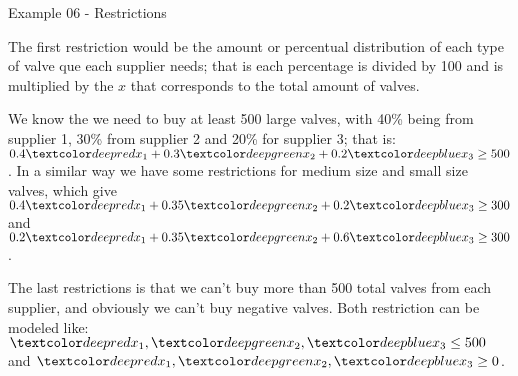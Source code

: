 \begin{frame}{Example 06 - Restrictions}

The first restriction would be the amount or percentual distribution of each
type of valve que each supplier needs; that is each percentage is divided by
100 and is multiplied by the $x$ that corresponds to the total amount of valves.

We know the we need to buy at least 500 large valves, with 40\% being from
supplier 1, 30\% from supplier 2 and 20\% for supplier 3; that is:
$0.4\colora{x_1} + 0.3 \colorb{x_2} + 0.2\colorc{x_3} \ge 500$. In a similar way
we have some restrictions for medium size and small size valves, which give
$0.4\colora{x_1} + 0.35\colorb{x_2} + 0.2\colorc{x_3} \ge 300$ and
$0.2\colora{x_1} + 0.35\colorb{x_2} + 0.6\colorc{x_3} \ge 300$.

The last restrictions is that we can't buy more than 500 total valves from each
supplier, and obviously we can't buy negative valves. Both restriction can be
modeled like:
$\colora{x_1}, \colorb{x_2}, \colorc{x_3} \le 500$ and
$\colora{x_1}, \colorb{x_2}, \colorc{x_3} \ge 0$.

\end{frame}
